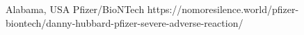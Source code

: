           {Alabama, USA}
          {}
          {Pfizer/BioNTech}
          {}
          {
          }
          {https://nomoresilence.world/pfizer-biontech/danny-hubbard-pfizer-severe-adverse-reaction/}



